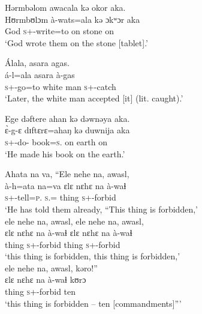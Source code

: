 \ea Hərmbəlom  awacala  kə  okor  aka.\\
 \gll Hʊrmbʊlɔm   à-wats=ala   kə   ɔkʷɔr   aka\\
 God    \textsc{s}+{\PFV}-write=to  on  stone  on\\
 \glt ‘God wrote them on the stone [tablet].’
 \z

\ea Álala,  asara  agas.\\
 \gll á-l=ala    asara     à-gas\\
 \textsc{s}+{\IFV}-go=to    {white man}  \textsc{s}+{\PFV}-catch\\
 \glt ‘Later, the white man accepted [it] (lit. caught).’
 \z

\ea Ege  dəftere  ahan  kə  dəwnəya  aka.\\
 \gll \`ɛ{}-g-ɛ     dɪftɛrɛ=ahaŋ          kə   duwnija    aka\\
 \textsc{s}+{\PFV}-do-{\CL}  book=\textsc{s}.{\POSS}       on  earth    on\\
 \glt ‘He made his book on the earth.’ 
 \z

\ea Ahata  na  va,  “Ele nehe na, awasl,\\
 \gll à-h=ata   na=va      ɛlɛ     nɛhɛ      na    à-waɬ\\ 
 \textsc{s}+{\PFV}-tell=\textsc{p}.{\IO}   \textsc{s}.{\DO}={\PRF}   thing  {\DEM}  {\PSP}  \textsc{s}+{\PFV}-forbid  \\
 \glt ‘He has told them already, “This thing is forbidden,’\\
 
 \medskip
  ele nehe na, awasl, ele nehe na, awasl,\\
 \gll ɛlɛ       nɛhɛ     na      à-waɬ    ɛlɛ       nɛhɛ       na      à-waɬ \\
 thing    {\DEM}     {\PSP}   \textsc{s}+{\PFV}-forbid  thing    {\DEM}     {\PSP}   \textsc{s}+{\PFV}-forbid    \\
 \glt ‘this thing is forbidden, this thing is forbidden,’\\
 
 \medskip
 ele nehe na, awasl, kəro!”\\
 \gll ɛlɛ       nɛhɛ     na     à-waɬ    kʊrɔ\\
 thing    {\DEM}     {\PSP}   \textsc{s}+{\PFV}-forbid    ten\\
 \glt ‘this thing is forbidden – ten [commandments]”’\\
\z

